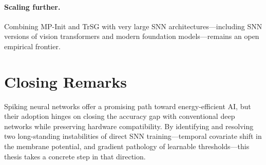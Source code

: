 \paragraph{Scaling further.}
Combining MP-Init and TrSG with very large SNN architectures—including SNN versions of vision transformers and modern foundation models—remains an open empirical frontier.

\section{Closing Remarks}
\label{sec:conclusion_closing}

Spiking neural networks offer a promising path toward energy-efficient AI, but their adoption hinges on closing the accuracy gap with conventional deep networks while preserving hardware compatibility. By identifying and resolving two long-standing instabilities of direct SNN training—temporal covariate shift in the membrane potential, and gradient pathology of learnable thresholds—this thesis takes a concrete step in that direction.
